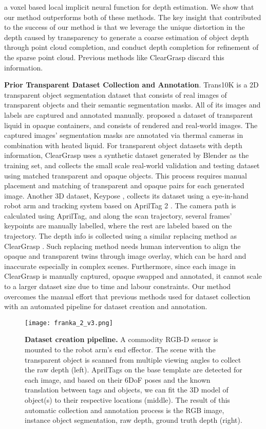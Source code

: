 \documentclass{article}
\begin{document}
a voxel based local implicit neural function for depth estimation. We show that our method outperforms both of these methods. The key insight that contributed to the success of our method is that we leverage the unique distortion in the depth caused by transparency to generate a coarse estimation of object depth through point cloud completion, and conduct depth completion for refinement of the sparse point cloud. Previous methods like ClearGrasp \citep{ClearGrasp} discard this information.

\textbf{Prior Transparent Dataset Collection and Annotation}. Trans10K\citep{xie2021segmenting} is a 2D transparent object segmentation dataset that consists of real images of transparent objects and their semantic segmentation masks. All of its images and labels are captured and annotated manually. \citet{doi:10.1177/0278364917734052} proposed a dataset of transparent liquid in opaque containers, and consists of rendered and real-world images. The captured images' segmentation masks are annotated via thermal cameras in combination with heated liquid. For transparent object datasets with depth information, ClearGrasp \citep{ClearGrasp} uses a synthetic dataset generated by Blender as the training set, and collects the small scale real-world validation and testing dataset using matched transparent and opaque objects. This process requires manual placement and matching of transparent and opaque pairs for each generated image. Another 3D dataset, Keypose \citep{Keypose}, collects its dataset using a eye-in-hand robot arm and tracking system based on AprilTag 2 \citep{apriltag2}. The camera path is calculated using AprilTag, and along the scan trajectory, several frames' keypoints are manually labelled, where the rest are labeled based on the trajectory. The depth info is collected using a similar replacing method as ClearGrasp \citep{ClearGrasp}. Such replacing method needs human intervention to align the opaque and transparent twins through image overlay, which can be hard and inaccurate especially in complex scenes.  Furthermore, since each image in ClearGrasp \citep{ClearGrasp} is manually captured, opaque swapped and annotated, it cannot scale to a larger dataset size due to time and labour constraints. Our method overcomes the manual effort that previous methods used for dataset collection with an automated pipeline for dataset creation and annotation.
\begin{figure}[t!]
\centering
\texttt{[image: franka\_2\_v3.png]} \\

\caption{\textbf{Dataset creation pipeline.} A commodity RGB-D sensor is mounted to the robot arm's end effector. The scene with the transparent object is scanned from multiple viewing angles to collect the raw depth (left). AprilTags on the base template are detected for each image, and based on their 6DoF poses and the known translation between tags and objects, we can fit the 3D model of object(s) to their respective locations (middle). The result of this automatic collection and annotation process is the RGB image, instance object segmentation, raw depth, ground truth depth (right).}
\label{fig:dataset_creation}
\end{figure}
\end{document}
